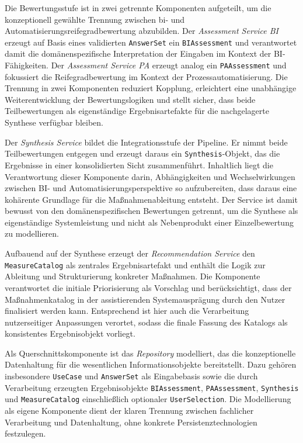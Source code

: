 Die Bewertungsstufe ist in zwei getrennte Komponenten aufgeteilt, um die konzeptionell gewählte Trennung zwischen \gls{bi}- und Automatisierungsreifegradbewertung abzubilden. Der \textit{Assessment Service BI} erzeugt auf Basis eines validierten \texttt{AnswerSet} ein \texttt{BIAssessment} und verantwortet damit die domänenspezifische Interpretation der Eingaben im Kontext der BI-Fähigkeiten. Der \textit{Assessment Service PA} erzeugt analog ein \texttt{PAAssessment} und fokussiert die Reifegradbewertung im Kontext der Prozessautomatisierung. Die Trennung in zwei Komponenten reduziert Kopplung, erleichtert eine unabhängige Weiterentwicklung der Bewertungslogiken und stellt sicher, dass beide Teilbewertungen als eigenständige Ergebnisartefakte für die nachgelagerte Synthese verfügbar bleiben.

Der \textit{Synthesis Service} bildet die Integrationsstufe der Pipeline. Er nimmt beide Teilbewertungen entgegen und erzeugt daraus ein \texttt{Synthesis}-Objekt, das die Ergebnisse in einer konsolidierten Sicht zusammenführt. Inhaltlich liegt die Verantwortung dieser Komponente darin, Abhängigkeiten und Wechselwirkungen zwischen BI- und Automatisierungsperspektive so aufzubereiten, dass daraus eine kohärente Grundlage für die Maßnahmenableitung entsteht. Der Service ist damit bewusst von den domänenspezifischen Bewertungen getrennt, um die Synthese als eigenständige Systemleistung und nicht als Nebenprodukt einer Einzelbewertung zu modellieren.

Aufbauend auf der Synthese erzeugt der \textit{Recommendation Service} den \texttt{MeasureCatalog} als zentrales Ergebnisartefakt und enthält die Logik zur Ableitung und Strukturierung konkreter Maßnahmen. Die Komponente verantwortet die initiale Priorisierung als Vorschlag und berücksichtigt, dass der Maßnahmenkatalog in der assistierenden Systemausprägung durch den Nutzer finalisiert werden kann. Entsprechend ist hier auch die Verarbeitung nutzerseitiger Anpassungen verortet, sodass die finale Fassung des Katalogs als konsistentes Ergebnisobjekt vorliegt.

Als Querschnittskomponente ist das \textit{Repository} modelliert, das die konzeptionelle Datenhaltung für die wesentlichen Informationsobjekte bereitstellt. Dazu gehören insbesondere \texttt{UseCase} und \texttt{AnswerSet} als Eingabebasis sowie die durch Verarbeitung erzeugten Ergebnisobjekte \texttt{BIAssessment}, \texttt{PAAssessment}, \texttt{Synthesis} und \texttt{MeasureCatalog} einschließlich optionaler \texttt{UserSelection}. Die Modellierung als eigene Komponente dient der klaren Trennung zwischen fachlicher Verarbeitung und Datenhaltung, ohne konkrete Persistenztechnologien festzulegen.

